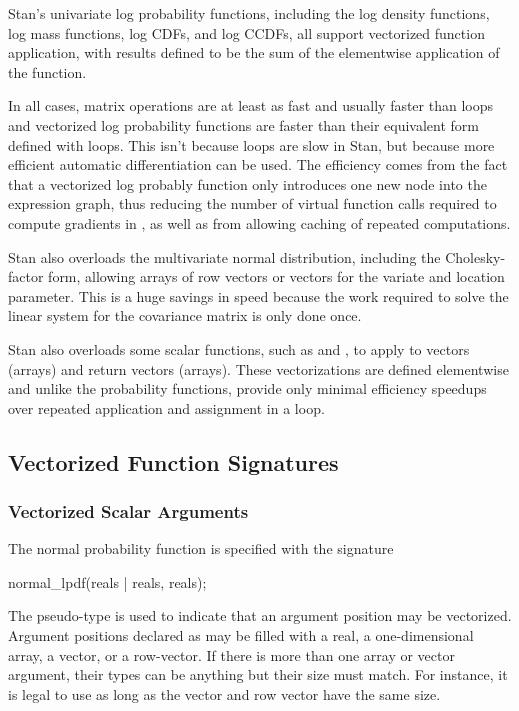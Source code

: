 \noindent
Stan's univariate log probability functions, including the log density
functions, log mass functions, log CDFs, and log CCDFs, all support vectorized
function application, with results defined to be the sum of the
elementwise application of the function.

In all cases, matrix operations are at least as fast and usually
faster than loops and vectorized log probability functions are faster
than their equivalent form defined with loops.  This isn't because
loops are slow in Stan, but because more efficient automatic
differentiation can be used.  The efficiency comes from the fact that
a vectorized log probably function only introduces one new node into
the expression graph, thus reducing the number of virtual function
calls required to compute gradients in \Cpp, as well as from allowing
caching of repeated computations.

Stan also overloads the multivariate normal distribution, including
the Cholesky-factor form, allowing arrays of row vectors or vectors
for the variate and location parameter.  This is a huge savings in
speed because the work required to solve the linear system for the
covariance matrix is only done once.

Stan also overloads some scalar functions, such as  and
, to apply to vectors (arrays) and return vectors (arrays).  
These vectorizations are defined elementwise and unlike the
probability functions, provide only minimal efficiency speedups over
repeated application and assignment in a loop.


\subsection{Vectorized Function Signatures}\label{prob-vectorization.section}

\subsubsection{Vectorized Scalar Arguments}

The normal probability function is specified with the signature
%
\begin{stancode}
normal_lpdf(reals | reals, reals);
\end{stancode}
%
The pseudo-type  is used to indicate that an argument
position may be vectorized.  Argument positions declared as
 may be filled with a real, a one-dimensional array, a
vector, or a row-vector.  If there is more than one array or vector
argument, their types can be anything but their size must match.  For
instance, it is legal to use
 as long as the vector and
row vector have the same size.  

